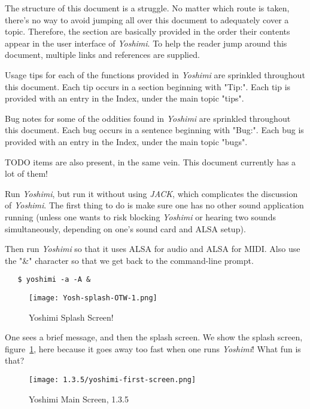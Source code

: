 \documentclass[
 11pt,
 twoside,
 a4paper,
 headinclude,
 footinclude,
 final                                 %
]{article}
\begin{document}
   The structure of this document is a struggle.  No matter which route is
   taken, there's no way to avoid jumping all over this document to
   adequately cover a topic.  Therefore, the section are basically provided
   in the order their contents appear in the user interface of
   \textsl{Yoshimi}.  To help the reader jump around this document, multiple
   links and references are supplied.

   Usage tips
   for each of the functions provided in
   \textsl{Yoshimi} are sprinkled throughout this document.
   Each tip occurs in a section beginning with "Tip:".
   Each tip is provided with an entry in the Index, under the
   main topic "tips".

   Bug notes
   for some of the oddities found in \textsl{Yoshimi} are
   sprinkled throughout this document.
   Each bug occurs in a sentence beginning with "Bug:".
   Each bug is provided with an entry in the Index, under the
   main topic "bugs".

   TODO items
   are also present, in the same vein.
   This document currently has a lot of them!

   Run \textsl{Yoshimi}, but run it without using \textsl{JACK}, which
   complicates the discussion of \textsl{Yoshimi}.  The first
   thing to do is make sure one has no other sound application running
   (unless one wants to risk blocking \textsl{Yoshimi} or hearing two sounds
   simultaneously, depending on one's sound card and ALSA setup).

   Then run \textsl{Yoshimi} so that it uses ALSA for audio and ALSA for
   MIDI.  Also use the "\&" character so that we get back to the
   command-line prompt.

\begin{verbatim}
   $ yoshimi -a -A &
\end{verbatim}

\begin{figure}[H]
   \centering 
   \texttt{[image: Yosh-splash-OTW-1.png]}
   \caption{Yoshimi Splash Screen!}
   \label{fig:yoshimi_splash_screen}
\end{figure}

   One sees a brief message, and then the splash screen.
   We show the splash screen, figure~\ref{fig:yoshimi_splash_screen},
   here because it goes away too
   fast when one runs \textsl{Yoshimi}!
   What fun is that?

\begin{figure}[H]
   \centering 
   \texttt{[image: 1.3.5/yoshimi-first-screen.png]}
   \caption{Yoshimi Main Screen, 1.3.5}
   \label{fig:yoshimi_main_screen}
\end{figure}
\end{document}
